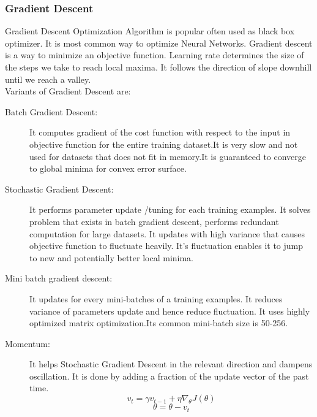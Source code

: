             \subsubsection{Gradient Descent}
                Gradient Descent Optimization Algorithm is popular often used as black box optimizer. It is most common way to optimize Neural Networks. Gradient descent is a way to minimize an objective function. Learning rate determines the size of the steps we take to reach local maxima. It follows the direction of slope downhill until we reach a valley.\\
                Variants of Gradient Descent are: 
                \begin{description}
                    \item [Batch Gradient Descent:] It computes gradient of the cost function with respect to the input in objective function for the entire training dataset.It is very slow and not used for datasets that does not fit in memory.It is guaranteed to converge to global minima for convex error surface.   
                    \item [Stochastic Gradient Descent:] It performs parameter update /tuning for each training examples. 
                    It solves problem that exists in batch gradient descent, performs redundant computation for large datasets. 
                    It updates with high variance that causes objective function to fluctuate heavily. 
                    It's fluctuation enables it to jump to new and potentially better local minima. 
                    \item [Mini batch gradient descent:] It updates for every mini-batches of a training examples. It reduces variance of parameters update and hence reduce fluctuation. It uses highly optimized matrix optimization.Its      common mini-batch size is 50-256.
                    \item [Momentum: ]It helps Stochastic Gradient Descent in the relevant direction and dampens oscillation. It is done by adding a fraction of the update vector of the past time.
                            \begin{equation}
                                v_t = \gamma v_{t-1} + \eta \nabla _\theta J(\theta)
                            \end{equation}
                            \begin{equation}
                                \theta = \theta - v_t
                            \end{equation}

\end{description}
